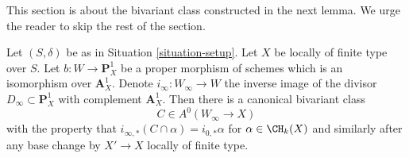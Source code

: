 \noindent
This section is about the bivariant class constructed in the next
lemma. We urge the reader to skip the rest of the section.

\begin{lemma}
\label{lemma-gysin-at-infty}
Let $(S, \delta)$ be as in Situation \ref{situation-setup}.
Let $X$ be locally of finite type over $S$. Let
$b : W \to \mathbf{P}^1_X$ be a proper morphism of schemes
which is an isomorphism over $\mathbf{A}^1_X$.
Denote $i_\infty : W_\infty \to W$ the inverse image of the divisor
$D_\infty \subset \mathbf{P}^1_X$ with complement $\mathbf{A}^1_X$.
Then there is a canonical bivariant class
$$
C \in A^0(W_\infty \to X)
$$
with the property that
$i_{\infty, *}(C \cap \alpha) = i_{0, *}\alpha$
for $\alpha \in \CH_k(X)$ and similarly after any base change by
$X' \to X$ locally of finite type.
\end{lemma}

